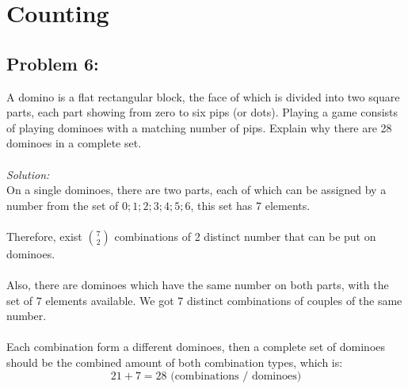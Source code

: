 \documentclass[a4paper]{article}
\begin{document}
\begin{titlepage}
\begin{center}
\begin{minipage}{0.4\textwidth}
\begin{flushright}
				\end{flushright}
			\end{minipage}
			
			\vfill
			
			\vspace{2cm}
			{\large} %
		\end{center}
	\end{titlepage}
	
	\section*{Counting}
	\subsection*{Problem 6:}
	A domino is a
	flat rectangular block, the face of which is divided into two square parts, each part showing from zero to six pips (or dots). Playing a game consists of playing dominoes with a matching number of pips. Explain why there are 28 dominoes in a complete set.\\\\
	\textit{Solution:}\\
	On a single dominoes, there are two parts, each of which can be assigned by a number from the set of ${0;1;2;3;4;5;6}$, this set has 7 elements.\\\\
	Therefore, exist ${7 \choose 2}$ combinations of 2 distinct number that can be put on dominoes.\\\\
	Also, there are dominoes which have the same number on both parts, with the set of 7 elements available. We got 7 distinct combinations of couples of the same number.\\\\
	Each combination form a different dominoes, then a complete set of dominoes should be the combined amount of both combination types, which is:
	\begin{equation*}
	   	21 + 7 = 28 \text{ (combinations / dominoes)}
	\end{equation*}

\end{document}
